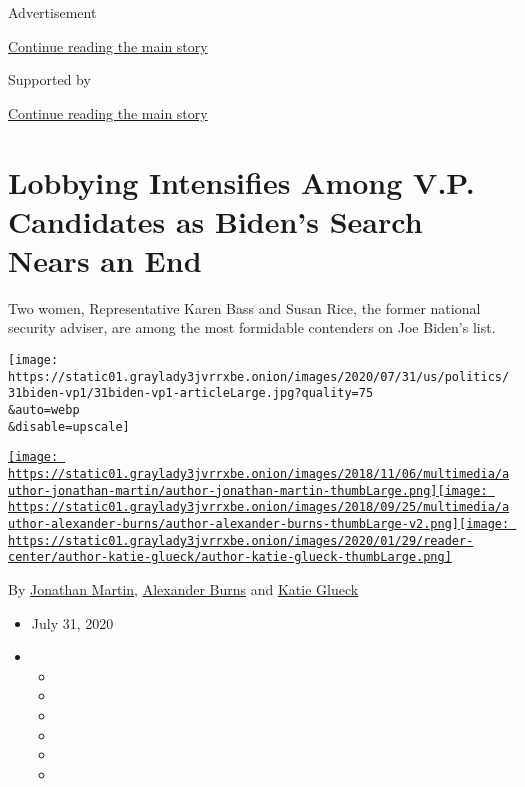 Advertisement

\protect\hyperlink{after-top}{Continue reading the main story}

Supported by

\protect\hyperlink{after-sponsor}{Continue reading the main story}

\hypertarget{lobbying-intensifies-among-vp-candidates-as-bidens-search-nears-an-end}{%
\section{Lobbying Intensifies Among V.P. Candidates as Biden's Search
Nears an
End}\label{lobbying-intensifies-among-vp-candidates-as-bidens-search-nears-an-end}}

Two women, Representative Karen Bass and Susan Rice, the former national
security adviser, are among the most formidable contenders on Joe
Biden's list.

\texttt{[image: https://static01.graylady3jvrrxbe.onion/images/2020/07/31/us/politics/31biden-vp1/31biden-vp1-articleLarge.jpg?quality=75\\\&auto=webp\\\&disable=upscale]}

\href{https://www.nytimes3xbfgragh.onion/by/jonathan-martin}{\texttt{[image: https://static01.graylady3jvrrxbe.onion/images/2018/11/06/multimedia/author-jonathan-martin/author-jonathan-martin-thumbLarge.png]}}\href{https://www.nytimes3xbfgragh.onion/by/alexander-burns}{\texttt{[image: https://static01.graylady3jvrrxbe.onion/images/2018/09/25/multimedia/author-alexander-burns/author-alexander-burns-thumbLarge-v2.png]}}\href{https://www.nytimes3xbfgragh.onion/by/katie-glueck}{\texttt{[image: https://static01.graylady3jvrrxbe.onion/images/2020/01/29/reader-center/author-katie-glueck/author-katie-glueck-thumbLarge.png]}}

By \href{https://www.nytimes3xbfgragh.onion/by/jonathan-martin}{Jonathan
Martin},
\href{https://www.nytimes3xbfgragh.onion/by/alexander-burns}{Alexander
Burns} and
\href{https://www.nytimes3xbfgragh.onion/by/katie-glueck}{Katie Glueck}

\begin{itemize}
\item
  July 31, 2020
\item
  \begin{itemize}
  \item
  \item
  \item
  \item
  \item
  \item
  \end{itemize}
\end{itemize}

